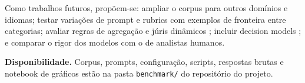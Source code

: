 \documentclass[12pt]{article}
\begin{document}
Como trabalhos futuros, propõem-se: ampliar o corpus para outros domínios e idiomas; testar variações de prompt e rubrics com exemplos de fronteira entre categorias; avaliar regras de agregação e júris dinâmicos \citep{li2025jury}; incluir decision models \citep{li2026jev}; e comparar o rigor dos modelos com o de analistas humanos.

\textbf{Disponibilidade.} Corpus, prompts, configuração, scripts, respostas brutas e notebook de gráficos estão na pasta \texttt{benchmark/} do repositório do projeto.



\end{document}
